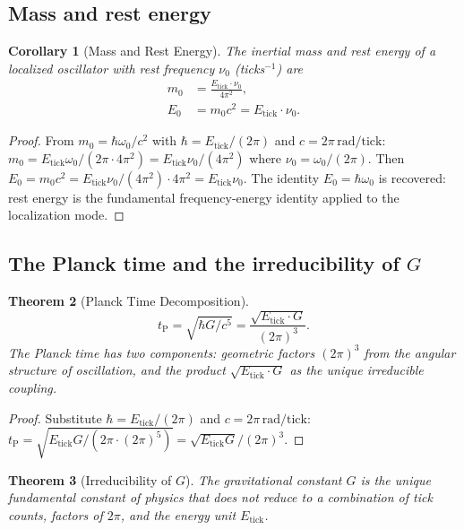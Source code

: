 \documentclass[twocolumn,10pt,a4paper]{article}
\theoremstyle{thmstyle}
\newtheorem{theorem}{Theorem}[section]
\newtheorem{corollary}[theorem]{Corollary}
\theoremstyle{definition}
\theoremstyle{remark}
\newcommand{\tP}{t_{\mathrm{P}}}
\begin{document}
\subsection{Mass and rest energy}

\begin{corollary}[Mass and Rest Energy]
\label{cor:mass}
The inertial mass and rest energy of a localized oscillator with rest
frequency $\nu_0$ (ticks$^{-1}$) are
\begin{align}
m_0 &= \frac{E_{\mathrm{tick}} \cdot \nu_0}{4\pi^2},
\label{eq:mass}\\
E_0 &= m_0 c^2 = E_{\mathrm{tick}} \cdot \nu_0.
\label{eq:E0}
\end{align}
\end{corollary}

\begin{proof}
From $m_0 = \hbar\omega_0/c^2$ with $\hbar = E_{\mathrm{tick}}/(2\pi)$ and
$c = 2\pi\,\mathrm{rad/tick}$: $m_0 = E_{\mathrm{tick}}\omega_0/(2\pi \cdot 4\pi^2)
= E_{\mathrm{tick}}\nu_0/(4\pi^2)$ where $\nu_0 = \omega_0/(2\pi)$.
Then $E_0 = m_0 c^2 = E_{\mathrm{tick}}\nu_0/(4\pi^2)\cdot 4\pi^2 = E_{\mathrm{tick}}\nu_0$.
The identity $E_0 = \hbar\omega_0$ is recovered: rest energy is the fundamental
frequency-energy identity applied to the localization mode.
\end{proof}

\subsection{The Planck time and the irreducibility of $G$}

\begin{theorem}[Planck Time Decomposition]
\label{thm:tP}
\begin{equation}
\tP = \sqrt{\hbar G/c^5} = \frac{\sqrt{E_{\mathrm{tick}} \cdot G}}{(2\pi)^3}.
\label{eq:tP}
\end{equation}
The Planck time has two components: geometric factors $(2\pi)^3$ from
the angular structure of oscillation, and the product $\sqrt{E_{\mathrm{tick}} \cdot G}$
as the unique irreducible coupling.
\end{theorem}

\begin{proof}
Substitute $\hbar = E_{\mathrm{tick}}/(2\pi)$ and $c = 2\pi\,\mathrm{rad/tick}$:
$\tP = \sqrt{E_{\mathrm{tick}} G/(2\pi \cdot (2\pi)^5)} = \sqrt{E_{\mathrm{tick}} G}/(2\pi)^3$.
\end{proof}

\begin{theorem}[Irreducibility of $G$]
\label{thm:G}
The gravitational constant $G$ is the unique fundamental constant of physics
that does not reduce to a combination of tick counts, factors of $2\pi$,
and the energy unit $E_{\mathrm{tick}}$.
\end{theorem}
\end{document}
